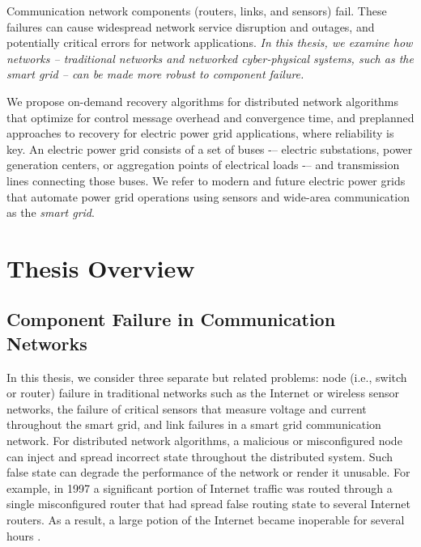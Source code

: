 
Communication network components (routers, links, and sensors) fail. %
These failures can cause widespread network service disruption and outages, and potentially critical errors for network applications.
\textit{In this thesis, we examine how networks -- traditional networks and networked cyber-physical systems, such as the smart grid -- can be made more robust to component failure.}

We propose on-demand recovery algorithms for distributed network algorithms that optimize for control message overhead and convergence time,
and preplanned approaches to recovery for electric power grid applications, where reliability is key. 
An electric power grid consists of a set of buses -– electric substations, power generation centers, or aggregation points of electrical loads -– and transmission lines connecting those buses.
We refer to modern and future electric power grids that automate power grid operations using sensors and wide-area communication as the \emph{smart grid}.




\section{Thesis Overview}

\subsection{Component Failure in Communication Networks}

In this thesis, we consider three separate but related problems: node (i.e., switch or router) failure in traditional networks such as the Internet or wireless sensor networks,
the failure of critical sensors that measure voltage and current throughout the smart grid, and link failures in a smart grid communication network.
For distributed network algorithms, a malicious or misconfigured node can inject and spread incorrect state throughout the distributed system. 
Such false state can degrade the performance of the network or render it unusable. For example, in 1997 a significant portion of Internet traffic was routed through a 
single misconfigured router that had spread false routing state to several Internet routers.  As a result, a large potion of the Internet became inoperable for several hours \cite{Neumann97}. 



